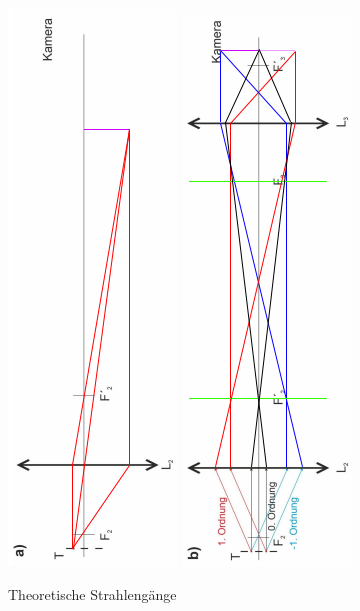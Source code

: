 \documentclass[12pt,a4paper,twoside]{article}
\begin{document}
\begin{figure}[H]
    \centering
    \includegraphics[width=0.3\linewidth, angle=-90]{nudes/Strahlenganga.png}
    \includegraphics[width=0.3\linewidth, angle=-90]{nudes/Strahlengangb.png}
    \caption{Theoretische Strahlengänge}
    \label{fig:SimulationBlau}
\end{figure}
\end{document}

